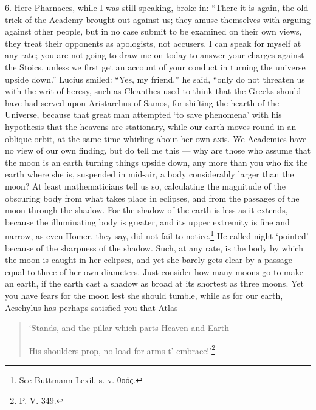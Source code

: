 \documentclass[a4paper, 11pt, oneside, polutonikogreek, english]{article}
\begin{document}
6. Here Pharnaces, while I was still speaking, broke in: ``There it is again, the old trick of the Academy brought out against us; they amuse themselves with arguing against other people, but in no case submit to be examined on their own views, they treat their opponents as apologists, not accusers. I can speak for myself at any rate; you are not going to draw me on today to answer your charges against the Stoics, unless we first get an account of your conduct in turning the universe upside down.'' Lucius smiled: ``Yes, my friend,'' he said, ``only do not threaten us with the writ of heresy, such as Cleanthes used to think that the Greeks should have had served upon Aristarchus of Samos, for shifting the hearth of the Universe, because that great man attempted `to save phenomena' with his hypothesis that the heavens are stationary, while our earth moves round in an oblique orbit, at the same time whirling about her own axis. We Academics have no view of our own finding, but do tell me this --- why are those who assume that the moon is an earth turning things upside down, any more than you who fix the earth where she is, suspended in mid-air, a body considerably larger than the moon? At least mathematicians tell us so, calculating the magnitude of the obscuring body from what takes place in eclipses, and from the passages of the moon through the shadow. For the shadow of the earth is less as it extends, because the illuminating body is greater, and its upper extremity is fine and narrow, as even Homer, they say, did not fail to notice.\footnote{See Buttmann Lexil. s. v. θοός.} He called night `pointed' because of the sharpness of the shadow. Such, at any rate, is the body by which the moon is caught in her eclipses, and yet she barely gets clear by a passage equal to three of her own diameters. Just consider how many moons go to make an earth, if the earth cast a shadow as broad at its shortest as three moons. Yet you have fears for the moon lest she should tumble, while as for our earth, Aeschylus has perhaps satisfied you that Atlas 
\begin{quotation}
`Stands, and the pillar which parts Heaven and Earth

His shoulders prop, no load for arms t' embrace!'\footnote{P. V. 349.}
\end{quotation}
\end{document}
